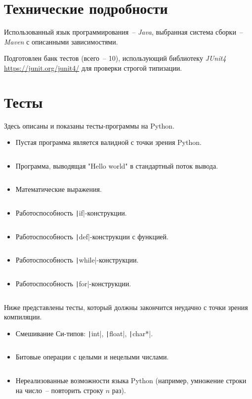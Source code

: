 \documentclass[12pt, a4paper, oneside, final]{article}
\begin{document}
	\section{Технические подробности}
	Использованный язык программирования~-- \textit{Java}, выбранная система сборки~-- \textit{Maven} с описанными зависимостями.

	Подготовлен банк тестов (всего~-- 10), использующий библиотеку \textit{JUnit4} \url{https://junit.org/junit4/} для проверки строгой типизации.
	\section{Тесты}
	Здесь описаны и показаны тесты-программы на Python.
	\begin{itemize}
		\item Пустая программа является валидной с точки зрения Python.
		\inputminted{python}{./samples/empty.py}
		\item Программа, выводящая "Hello world" в стандартный поток вывода.
		\inputminted{python}{./samples/hello_world.py}
		\item Математические выражения.
		\inputminted{python}{./samples/calc.py}
		\item Работоспособность \texttt|if|-конструкции.
		\inputminted{python}{./samples/if.py}
		\item Работоспособность \texttt|def|-конструкции с функцией.
		\inputminted{python}{./samples/func.py}
		\item Работоспособность \texttt|while|-конструкции.
		\inputminted{python}{./samples/while.py}
		\item Работоспособность \texttt|for|-конструкции.
		\inputminted{python}{./samples/for.py}
	\end{itemize}
	Ниже представлены тесты, который должны закончится неудачно с точки зрения компиляции.
	\begin{itemize}
		\item Смешивание Си-типов: \texttt|int|, \texttt|float|, \texttt|char*|.
		\inputminted{python}{./samples/error_types.py}
		\item Битовые операции с целыми и нецелыми числами.
		\inputminted{python}{./samples/error_binary.py}
		\item Нереализованные возможности языка Python (например, умножение строки на число~-- повторить строку $n$ раз).
		\inputminted{python}{./samples/error_not_implemented_yet.py}
	\end{itemize}
\end{document}
